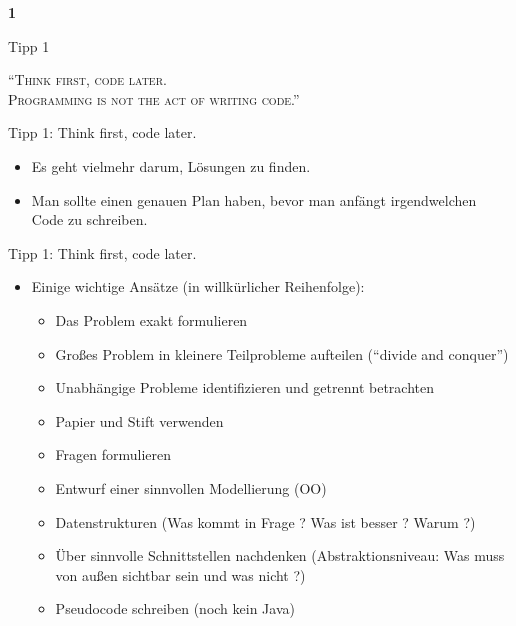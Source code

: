 \documentclass[18pt]{beamer}
\newcommand{\quotes}[1]{``#1''}
\begin{document}
\begin{frame}{\quad}
    \center
    \Huge{\textbf{1}}
\end{frame}

\begin{frame}{Tipp 1}
    \begin{block}{}
        \center
        \textsc{\quotes{Think first, code later.\\ Programming is not the act of writing code.}}
    \end{block}
\end{frame}

\begin{frame}{Tipp 1: Think first, code later.}
    \begin{itemize}
        \item Es geht vielmehr darum, Lösungen zu finden.
        \item Man sollte einen genauen Plan haben, bevor man anfängt irgendwelchen Code zu schreiben.
    \end{itemize}
\end{frame}

\begin{frame}{Tipp 1: Think first, code later.}
    \begin{itemize}
        \item Einige wichtige Ansätze (in willkürlicher Reihenfolge):
        \begin{itemize}
            \item Das Problem exakt formulieren
            \item Großes Problem in kleinere Teilprobleme aufteilen (\quotes{divide and conquer})
            \item Unabhängige Probleme identifizieren und getrennt betrachten
            \item Papier und Stift verwenden
            \item Fragen formulieren
            \item Entwurf einer sinnvollen Modellierung (OO)
            \item Datenstrukturen (Was kommt in Frage ? Was ist besser ? Warum ?)
            \item Über sinnvolle Schnittstellen nachdenken (Abstraktionsniveau: Was muss von außen sichtbar sein und was nicht ?)
            \item Pseudocode schreiben (noch kein Java)
        \end{itemize}
    \end{itemize}
\end{frame}
\end{document}
